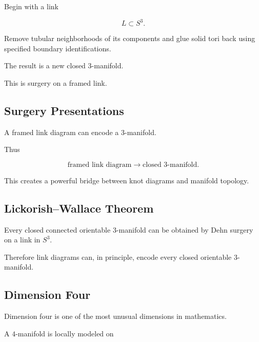 Begin with a link

\[
L\subset S^3.
\]

Remove tubular neighborhoods of its components and glue solid tori back
using specified boundary identifications.

The result is a new closed \(3\)-manifold.

This is surgery on a framed link.

\subsection{Surgery Presentations}
\label{subsec:surgery-presentations}

A framed link diagram can encode a \(3\)-manifold.

Thus

\[
\boxed{
\text{framed link diagram}
\longrightarrow
\text{closed }3\text{-manifold}.
}
\]

This creates a powerful bridge between knot diagrams and manifold topology.

\subsection{Lickorish--Wallace Theorem}
\label{subsec:lickorish-wallace}

\begin{theorem}
Every closed connected orientable \(3\)-manifold can be obtained by Dehn
surgery on a link in \(S^3\).
\end{theorem}

Therefore link diagrams can, in principle, encode every closed orientable
\(3\)-manifold.

\subsection{Dimension Four}
\label{subsec:dimension-four-topology}

Dimension four is one of the most unusual dimensions in mathematics.

A \(4\)-manifold is locally modeled on

